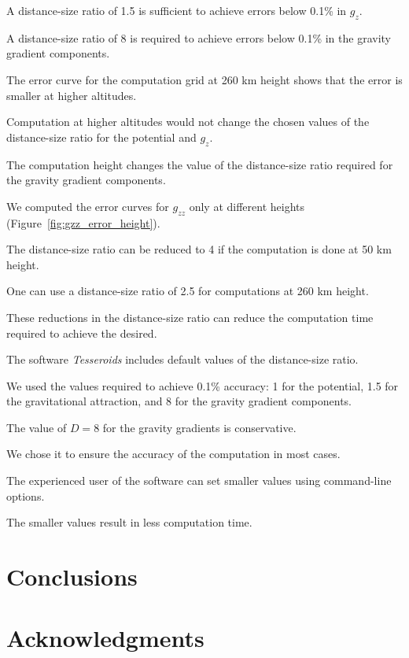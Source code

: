 \documentclass[paper,twocolumn]{geophysics}
\begin{document}
A distance-size ratio of 1.5 is sufficient to achieve errors below 0.1\% in
$g_z$.

A distance-size ratio of 8 is required to achieve errors below 0.1\% in
the gravity gradient components.

The error curve for the computation grid at 260 km height shows that
the error is smaller at higher altitudes.

Computation at higher altitudes would not change the chosen values of the
distance-size ratio for the potential and $g_z$.

The computation height changes the value of the distance-size ratio required
for the gravity gradient components.


We computed the error curves for $g_{zz}$ only at different heights
(Figure~\ref{fig:gzz_error_height}).

The distance-size ratio can be reduced to 4 if the computation is done at 50 km
height.

One can use a distance-size ratio of 2.5 for computations at 260 km height.

These reductions in the distance-size ratio can reduce the computation time
required to achieve the desired.



The software \textit{Tesseroids} includes default values of the distance-size
ratio.

We used the values required to achieve 0.1\% accuracy: 1 for the potential,
1.5 for the gravitational attraction, and 8 for the gravity gradient
components.

The value of $D=8$ for the gravity gradients is conservative.

We chose it to ensure the accuracy of the computation in most cases.

The experienced user of the software can set smaller values using command-line
options.

The smaller values result in less computation time.


\section{Conclusions}

\section{Acknowledgments}




\end{document}
